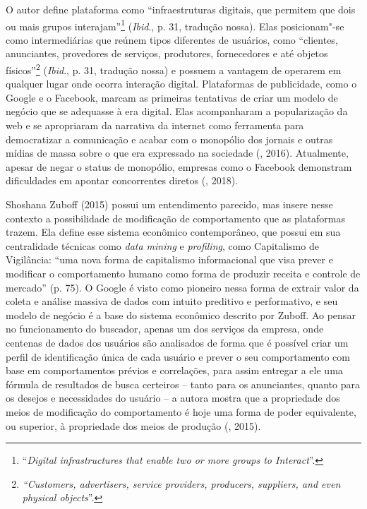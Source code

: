 O autor define plataforma como ``infraestruturas digitais, que permitem
que dois ou mais grupos interajam''\footnote{``\emph{Digital infrastructures
  that enable two or more groups to Interact}''.} (\emph{Ibid}., p. 31, tradução
nossa). Elas posicionam"-se como intermediárias que reúnem tipos
diferentes de usuários, como ``clientes, anunciantes, provedores de
serviços, produtores, fornecedores e até objetos físicos''\footnote{\emph{``Customers,
  advertisers, service providers, producers, suppliers, and even
  physical objects}''.} (\emph{Ibid}., p. 31, tradução nossa) e possuem a vantagem
de operarem em qualquer lugar onde ocorra interação digital. Plataformas
de publicidade, como o Google e o Facebook, marcam as primeiras
tentativas de criar um modelo de negócio que se adequasse à era digital.
Elas acompanharam a popularização da web e se apropriaram da narrativa
da internet como ferramenta para democratizar a comunicação e acabar com
o monopólio dos jornais e outras mídias de massa sobre o que era
expressado na sociedade (, 2016). Atualmente, apesar de negar o
status de monopólio, empresas como o Facebook demonstram dificuldades em
apontar concorrentes diretos (, 2018).

Shoshana Zuboff (2015) possui um entendimento parecido, mas insere nesse
contexto a possibilidade de modificação de comportamento que as
plataformas trazem. Ela define esse sistema econômico contemporâneo, que
possui em sua centralidade técnicas como \emph{data mining} e
\emph{profiling}, como Capitalismo de Vigilância: ``uma nova forma de
capitalismo informacional que visa prever e modificar o comportamento
humano como forma de produzir receita e controle de mercado'' (p. 75). O
Google é visto como pioneiro nessa forma de extrair valor da coleta e
análise massiva de dados com intuito preditivo e performativo, e seu
modelo de negócio é a base do sistema econômico descrito por Zuboff. Ao
pensar no funcionamento do buscador, apenas um dos serviços da empresa,
onde centenas de dados dos usuários são analisados de forma que é
possível criar um perfil de identificação única de cada usuário e prever
o seu comportamento com base em comportamentos prévios e correlações,
para assim entregar a ele uma fórmula de resultados de busca certeiros
-- tanto para os anunciantes, quanto para os desejos e necessidades do
usuário -- a autora mostra que a propriedade dos meios de modificação do
comportamento é hoje uma forma de poder equivalente, ou superior, à
propriedade dos meios de produção (, 2015).


